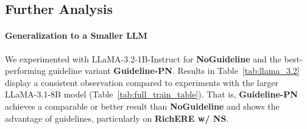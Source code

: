 \subsection{Further Analysis}
\label{sec:analyais}


\paragraph{Generalization to a Smaller LLM}
We experimented with LLaMA-3.2-1B-Instruct for \textbf{NoGuideline} and the best-performing guideline variant \textbf{Guideline-PN}. 
Results in Table~\ref{tab:llama_3.2} display a consistent observation compared to experiments with the larger LLaMA-3.1-8B model (Table~\ref{tab:full_train_table}). That is,
\textbf{Guideline-PN} achieves a comparable or better result than \textbf{NoGuideline} and shows the advantage of guidelines, particularly on \textbf{RichERE w/ NS}.


